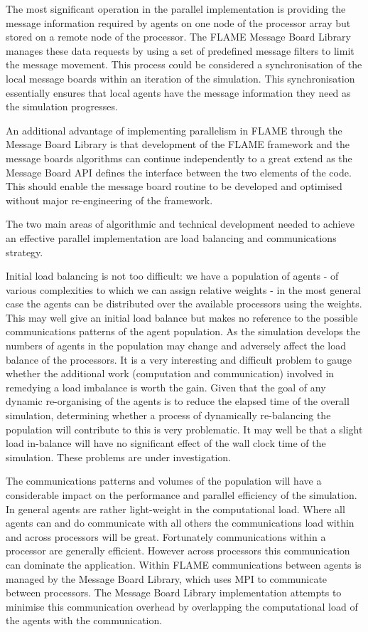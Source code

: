 The most significant operation in the parallel implementation is providing the message information required by agents on one node of the processor array but stored on a remote node of the processor. The FLAME Message Board Library manages these data requests by using a set of predefined message filters to limit the message movement. This process could be considered a synchronisation of the local message boards within an iteration of the simulation. This synchronisation essentially ensures that local agents have the message information they need as the simulation progresses.

An additional advantage of implementing parallelism in FLAME through the Message Board Library is that development of the FLAME framework and the message boards algorithms can continue independently to a great extend as the Message Board API defines the interface between the two elements of the code. This should enable the message board routine to be developed and optimised without major re-engineering of the framework.

The two main areas of algorithmic and technical development needed to achieve an effective parallel implementation are load balancing and communications strategy. 

Initial load balancing is not too difficult: we have a population of agents - of various complexities to which we can assign relative weights - in the most general case the agents can be distributed over the available processors using the weights. This may well give an initial load balance but makes no reference to the possible communications patterns of the agent population. As the simulation develops the numbers of agents in the population may change and adversely affect the load balance of the processors. It is a very interesting and difficult problem to gauge whether the additional work (computation and communication) involved in remedying a load imbalance  is worth the gain. Given that the goal of any dynamic re-organising of the agents is to reduce the elapsed time of the overall simulation, determining whether a process of dynamically re-balancing the population will contribute to this is very problematic. It may well be that a slight load in-balance will have no significant effect of the wall clock time of the simulation. These problems are under investigation.

The communications patterns and volumes of the population will have a considerable impact on the performance and parallel efficiency of the simulation. In general agents are rather light-weight in the computational load. Where all agents can and do communicate with all others the communications load within and across processors will be great. Fortunately communications within a processor are generally efficient. However across processors this communication can dominate the application. Within FLAME communications between agents is managed by the Message Board Library, which uses MPI to communicate between processors. The Message Board Library implementation attempts to minimise this communication overhead by overlapping the computational load of the agents with the communication. 

